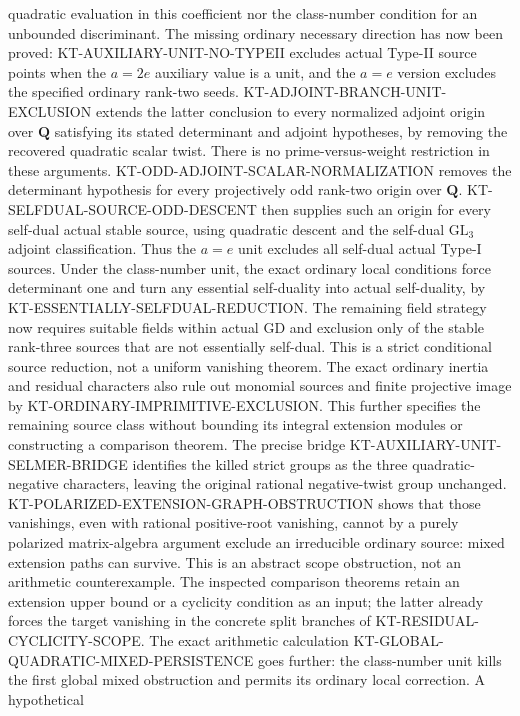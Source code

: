 \documentclass[11pt,a4paper]{article}
\theoremstyle{definition}
\begin{document}
quadratic evaluation in this coefficient nor the class-number
condition for an unbounded discriminant.
The missing ordinary necessary direction has now been proved:
KT-AUXILIARY-UNIT-NO-TYPEII excludes actual Type-II source points
when the $a=2e$ auxiliary value is a unit, and the $a=e$ version
excludes the specified ordinary rank-two seeds.
KT-ADJOINT-BRANCH-UNIT-EXCLUSION extends the latter conclusion
to every normalized adjoint origin over $\mathbf Q$ satisfying
its stated determinant and adjoint hypotheses, by removing
the recovered quadratic scalar twist. There is no
prime-versus-weight restriction in these arguments.
KT-ODD-ADJOINT-SCALAR-NORMALIZATION removes the determinant
hypothesis for every projectively odd rank-two origin over
$\mathbf Q$. KT-SELFDUAL-SOURCE-ODD-DESCENT then supplies
such an origin for every self-dual actual stable source, using
quadratic descent and the self-dual $\mathrm{GL}_3$ adjoint
classification. Thus the $a=e$ unit excludes all self-dual
actual Type-I sources. Under the class-number unit, the exact
ordinary local conditions force determinant one and turn any
essential self-duality into actual self-duality, by
KT-ESSENTIALLY-SELFDUAL-REDUCTION.
The remaining field strategy now requires suitable fields
within actual GD and exclusion only of the stable rank-three
sources that are not essentially self-dual. This is a strict
conditional source reduction, not a uniform vanishing theorem.
The exact ordinary inertia and residual characters also rule
out monomial sources and finite projective image by
KT-ORDINARY-IMPRIMITIVE-EXCLUSION. This further specifies the
remaining source class without bounding its integral extension
modules or constructing a comparison theorem.
The precise bridge KT-AUXILIARY-UNIT-SELMER-BRIDGE identifies
the killed strict groups as the three quadratic-negative
characters, leaving the original rational negative-twist
group unchanged. KT-POLARIZED-EXTENSION-GRAPH-OBSTRUCTION
shows that those vanishings, even with rational positive-root
vanishing, cannot by a purely polarized matrix-algebra argument
exclude an irreducible ordinary source: mixed extension paths
can survive. This is an abstract scope obstruction, not an
arithmetic counterexample. The inspected comparison theorems
retain an extension upper bound or a cyclicity condition as an
input; the latter already forces the target vanishing in the
concrete split branches of KT-RESIDUAL-CYCLICITY-SCOPE.
The exact arithmetic calculation
KT-GLOBAL-QUADRATIC-MIXED-PERSISTENCE goes further:
the class-number unit kills the first global mixed obstruction
and permits its ordinary local correction. A hypothetical
\end{document}
